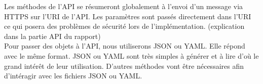 \documentclass[../rapport.tex]{subfiles}
\begin{document}
Les méthodes de l'API se résumeront globalement à l'envoi d'un message via HTTPS sur l'URI de l'API. Les paramètres sont passés directement dans l'URI ce qui posera des problèmes de sécurité lors de l'implémentation. (explication dans la partie API du rapport) \\
Pour passer des objets à l'API, nous utiliserons JSON ou YAML. Elle répond avec le même format. JSON ou YAML sont très simples à générer et à lire d'où le grand intérêt de leur utilisation. D'autres méthodes vont être nécessaires afin d'intéragir avec les fichiers JSON ou YAML.\\
\end{document}
